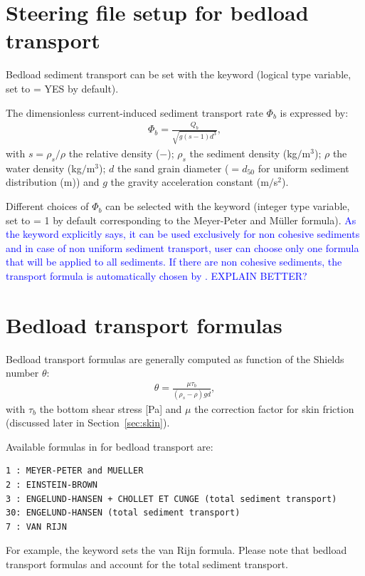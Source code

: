 \section{Steering file setup for bedload transport}
Bedload sediment transport can be set with the keyword  (logical type variable, set to {\ttfamily = YES} by default).

The dimensionless current-induced sediment transport rate $\Phi_b$ is expressed by:
\begin{align}
\Phi_b = \frac{Q_b}{\sqrt{g(s-1)d^3}},
\label{eq:Phis}
\end{align}
with $s=\rho_s/\rho$ the relative density ($-$); $\rho_s$ the sediment density (kg$/$m$^3$); $\rho$ the water density (kg$/$m$^3$); $d$ the sand grain diameter ($=d_{50}$ for uniform sediment distribution (m)) and $g$ the gravity acceleration constant (m$/$s$^2$).

Different choices of $\Phi_b$ can be selected with the keyword  (integer type variable, set to {\ttfamily = 1} by default corresponding to the Meyer-Peter and M\"uller formula). \textcolor{blue}{As the keyword explicitly says, it can be used exclusively for non cohesive sediments and in case of non uniform sediment transport, user can choose only one formula that will be applied to all sediments. If there are non cohesive sediments, the transport formula is automatically chosen by \gaia{}. EXPLAIN BETTER?}

\section{Bedload transport formulas}
Bedload transport formulas are generally computed as function of the Shields number $\theta$:
\begin{align}
\theta=\frac{\mu\tau_b}{(\rho_s-\rho)gd},
\label{eq:shieldsp}
\end{align}
with $\tau_b$ the bottom shear stress [Pa] and $\mu$ the correction factor for skin friction (discussed later in Section~\ref{sec:skin}).

Available formulas in \gaia{} for bedload transport are:
\begin{lstlisting}[frame=trBL]
1 : MEYER-PETER and MUELLER
2 : EINSTEIN-BROWN
3 : ENGELUND-HANSEN + CHOLLET ET CUNGE (total sediment transport)
30: ENGELUND-HANSEN (total sediment transport)
7 : VAN RIJN
\end{lstlisting}
For example, the keyword  sets the van Rijn formula. Please note that bedload transport formulas  and  account for the total sediment transport.

